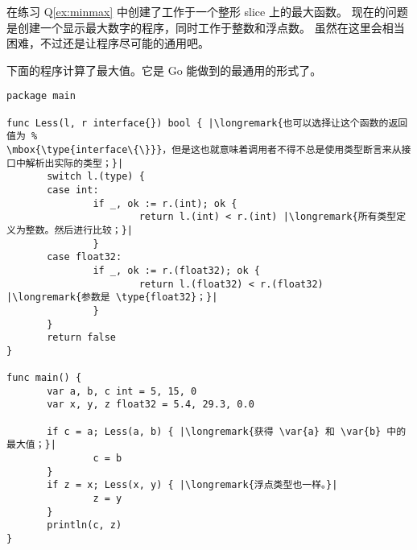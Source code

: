 \begin{Exercise}[title={接口和 max()},difficulty=2]
\Question
在练习 Q\ref{ex:minmax} 中创建了工作于一个整形 slice 上的最大函数。
现在的问题是创建一个显示最大数字的程序，同时工作于整数和浮点数。
虽然在这里会相当困难，不过还是让程序尽可能的通用吧。
\end{Exercise}

\begin{Answer}
\Question
下面的程序计算了最大值。它是 Go 能做到的最通用的形式了。

\begin{lstlisting}[caption=通用的计算最大值]
package main

func Less(l, r interface{}) bool { |\longremark{也可以选择让这个函数的返回值为 %
\mbox{\type{interface\{\}}}，但是这也就意味着调用者不得不总是使用类型断言来从接口中解析出实际的类型；}|
       switch l.(type) {
       case int:
               if _, ok := r.(int); ok {
                       return l.(int) < r.(int) |\longremark{所有类型定义为整数。然后进行比较；}|
               }
       case float32:
               if _, ok := r.(float32); ok {
                       return l.(float32) < r.(float32) |\longremark{参数是 \type{float32}；}|
               }
       }
       return false
}

func main() {
       var a, b, c int = 5, 15, 0
       var x, y, z float32 = 5.4, 29.3, 0.0

       if c = a; Less(a, b) { |\longremark{获得 \var{a} 和 \var{b} 中的最大值；}|
               c = b
       }
       if z = x; Less(x, y) { |\longremark{浮点类型也一样。}|
               z = y
       }
       println(c, z)
}
\end{lstlisting}
\showremarks
\end{Answer}
